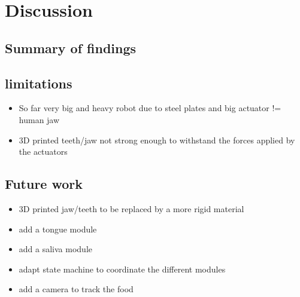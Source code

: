 \section{Discussion}
\subsection{Summary of findings}

\subsection{limitations}
\begin{itemize}
    \item So far very big and heavy robot due to steel plates and big actuator != human jaw
    \item 3D printed teeth/jaw not strong enough to withstand the forces applied by the actuators
\end{itemize}

\subsection{Future work}
\begin{itemize}
    \item 3D printed jaw/teeth to be replaced by a more rigid material
    \item add a tongue module
    \item add a saliva module
    \item adapt state machine to coordinate the different modules
    \item add a camera to track the food
\end{itemize}
